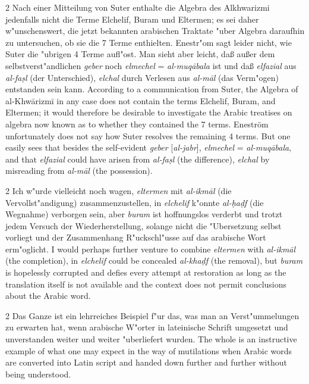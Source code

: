 \documentclass[10pt,a4paper]{article}
\renewcommand{\switchcolumn}{\syncronize\nointerlineskip\columnbreak}
\begin{document}
\begin{paracol}{2}
Nach einer Mitteilung von Suter enthalte die Algebra des Alkhwarizmi jedenfalls nicht die Terme Elchelif, Buram und Eltermen; es sei daher w"unschenswert, die jetzt bekannten arabischen Traktate "uber Algebra daraufhin zu untersuchen, ob sie die 7 Terme enthielten. Enestr"om sagt leider nicht, wie Suter die "ubrigen 4 Terme aufl"ost. Man sieht aber leicht, da\ss{} au\ss{}er dem selbstverst"andlichen \textit{geber} noch \textit{elmechel} = \textit{al-muq\=abala} ist und da\ss{} \textit{elfazial} aus \textit{al-fa\d{s}l} (der Unterschied), \textit{elchal} durch Verlesen aus \textit{al-m\=al} (das Verm"ogen) entstanden sein kann.
\switchcolumn
According to a communication from Suter, the Algebra of al-Khw\=arizm\={i} in any case does not contain the terms Elchelif, Buram, and Eltermen; it would therefore be desirable to investigate the Arabic treatises on algebra now known as to whether they contained the 7 terms. Enestr\"om unfortunately does not say how Suter resolves the remaining 4 terms. But one easily sees that besides the self-evident \textit{geber} [\textit{al-jabr}], \textit{elmechel} = \textit{al-muq\=abala}, and that \textit{elfazial} could have arisen from \textit{al-fa\d{s}l} (the difference), \textit{elchal} by misreading from \textit{al-m\=al} (the possession).
\end{paracol}

\begin{paracol}{2}
Ich w"urde vielleicht noch wagen, \textit{eltermen} mit \textit{al-ikm\=al} (die Vervollst"andigung) zusammenzustellen, in \textit{elchelif} k"onnte \textit{al-\d{h}a\d{d}f} (die Wegnahme) verborgen sein, aber \textit{buram} ist hoffnungslos verderbt und trotzt jedem Versuch der Wiederherstellung, solange nicht die "Ubersetzung selbst vorliegt und der Zusammenhang R"uckschl"usse auf das arabische Wort erm"oglicht.
\switchcolumn
I would perhaps further venture to combine \textit{eltermen} with \textit{al-ikm\=al} (the completion), in \textit{elchelif} could be concealed \textit{al-kha\d{d}f} (the removal), but \textit{buram} is hopelessly corrupted and defies every attempt at restoration as long as the translation itself is not available and the context does not permit conclusions about the Arabic word.
\end{paracol}

\begin{paracol}{2}
Das Ganze ist ein lehrreiches Beispiel f"ur das, was man an Verst"ummelungen zu erwarten hat, wenn arabische W"orter in lateinische Schrift umgesetzt und unverstanden weiter und weiter "uberliefert wurden.
\switchcolumn
The whole is an instructive example of what one may expect in the way of mutilations when Arabic words are converted into Latin script and handed down further and further without being understood.
\end{paracol}
\end{document}
